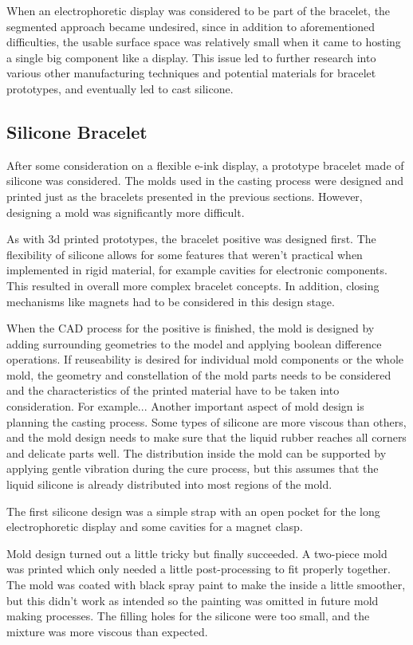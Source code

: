 When an electrophoretic display was considered to be part of the bracelet, the segmented approach became undesired, since in addition to aforementioned difficulties, the usable surface space was relatively small when it came to hosting a single big component like a display. This issue led to further research into various other manufacturing techniques and potential materials for bracelet prototypes, and eventually led to cast silicone.

\subsection{Silicone Bracelet}

After some consideration on a flexible e-ink display, a prototype bracelet made of silicone was considered. The molds used in the casting process were designed and printed just as the bracelets presented in the previous sections. However, designing a mold was significantly more difficult.

As with 3d printed prototypes, the bracelet positive was designed first. The flexibility of silicone allows for some features that weren't practical when implemented in rigid material, for example cavities for electronic components. This resulted in overall more complex bracelet concepts. In addition, closing mechanisms like magnets had to be considered in this design stage.

When the \ac{CAD} process for the positive is finished, the mold is designed by adding surrounding geometries to the model and applying boolean difference operations. If reuseability is desired for individual mold components or the whole mold, the geometry and constellation of the mold parts needs to be considered and the characteristics of the printed material have to be taken into consideration. For example... %
Another important aspect of mold design is planning the casting process. Some types of silicone are more viscous than others, and the mold design needs to make sure that the liquid rubber reaches all corners and delicate parts well. The distribution inside the mold can be supported by applying gentle vibration during the cure process, but this assumes that the liquid silicone is already distributed into most regions of the mold.

The first silicone design was a simple strap with an open pocket for the long electrophoretic display and some cavities for a magnet clasp.

Mold design turned out a little tricky but finally succeeded. A two-piece mold was printed which only needed a little post-processing to fit properly together. The mold was coated with black spray paint to make the inside a little smoother, but this didn't work as intended so the painting was omitted in future mold making processes. The filling holes for the silicone were too small, and the mixture was more viscous than expected.

